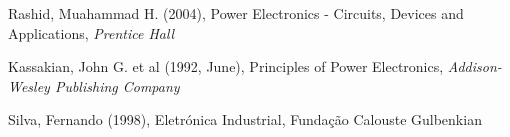 \documentclass[a4paper,11pt]{article}
\numberwithin{equation}{section}
\begin{document}
\pagebreak

\begin{thebibliography}{2}
	
	Rashid, Muahammad H. (2004), Power Electronics - Circuits, Devices and Applications, \textit{Prentice Hall}	
	
	Kassakian, John G. et al (1992, June), Principles of Power Electronics, \textit{Addison-Wesley Publishing Company}
	
	Silva, Fernando (1998), Eletrónica Industrial, Fundação Calouste Gulbenkian
	
\end{thebibliography}


\pagebreak
\end{document}
